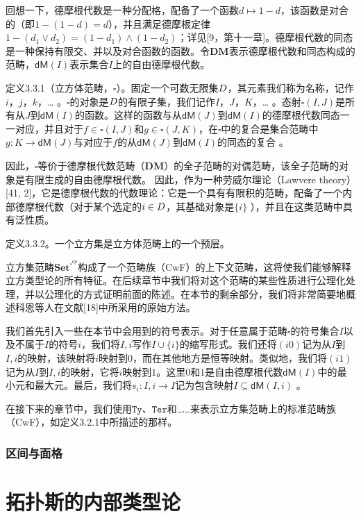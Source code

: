 \documentclass{ctexrep}
\let\mathbb\relax %
\theoremstyle{plain}
\theoremstyle{definition}
\theoremstyle{remark}
\newcommand\Ty{\mathtt{Ty}}
\newcommand\Ter{\mathtt{Ter}}
\newcommand\Set{\mathbf{Set}}
\newcommand{\DM}{\mathbf{DM}}
\newcommand{\dM}{\mathsf{dM}}
\newcommand{\ul}{{\rule[0ex]{0.5em}{0.4pt}}} %
\begin{document}
回想一下，德摩根代数是一种分配格，配备了一个函数\(d \mapsto 1 - d\)，该函数是对合的（即\(1 - (1 - d) = d\)），并且满足德摩根定律\(1 - (d_1 \lor d_2) = (1 - d_1) \land (1 - d_2)\)；详见[9，第十一章]。德摩根代数的同态是一种保持有限交、并以及对合函数的函数。令\(\DM\)表示德摩根代数和同态构成的范畴，\(\dM(I)\)表示集合\(I\)上的自由德摩根代数。

定义3.3.1（立方体范畴，\(\square\)）。固定一个可数无限集\(\mathbb{D}\)，其元素我们称为名称，记作\(i\)，\(j\)，\(k\)，… 。\(\square\)的对象是\(\mathbb{D}\)的有限子集，我们记作\(I\)，\(J\)，\(K\)，… 。态射\(\square(I, J)\)是所有从\(J\)到\(\dM(I)\)的函数。这样的函数与从\(\dM(J)\)到\(\dM(I)\)的德摩根代数同态一一对应，并且对于\(f\in\square(I, J)\)和\(g\in\square(J, K)\)，在\(\square\)中的复合是集合范畴中\(g: K \to \dM(J)\)与对应于\(f\)的从\(\dM(J)\)到\(\dM(I)\)的同态的复合 。

因此，\(\square\)等价于德摩根代数范畴（\(\DM\)）的全子范畴的对偶范畴，该全子范畴的对象是有限生成的自由德摩根代数。 因此，作为一种劳威尔理论（Lawvere theory）[41, 2]，它是德摩根代数的代数理论：它是一个具有有限积的范畴，配备了一个内部德摩根代数（对于某个选定的\(i \in \mathbb{D}\)，其基础对象是\(\{i\}\) ），并且在这类范畴中具有泛性质。 

定义3.3.2。一个立方集是立方体范畴上的一个预层。 

立方集范畴\(\Set^{\square^{op}}\)构成了一个范畴族（CwF）的上下文范畴，这将使我们能够解释立方类型论的所有特征。在后续章节中我们将对这个范畴的某些性质进行公理化处理，并以公理化的方式证明前面的陈述。在本节的剩余部分，我们将非常简要地概述科恩等人在文献[18]中所采用的原始方法。

我们首先引入一些在本节中会用到的符号表示。对于任意属于范畴\(\square\)的符号集合\(I\)以及不属于\(I\)的符号\(i\)，我们将\(I,i\)写作\(I \cup \{i\}\)的缩写形式。我们还将\((i0)\)记为从\(I\)到\(I,i\)的映射，该映射将\(i\)映射到\(0\)，而在其他地方是恒等映射。类似地，我们将\((i1)\)记为从\(I\)到\(I,i\)的映射，它将\(i\)映射到\(1\)。这里\(0\)和\(1\)是自由德摩根代数\(\dM(I)\)中的最小元和最大元。最后，我们将\(s_{i}: I,i \to I\)记为包含映射\(I \subseteq \dM(I, i)\) 。 

在接下来的章节中，我们使用\(\Ty\)、\(\Ter\)和\(\ul .\ul \)来表示立方集范畴上的标准范畴族（CwF），如定义3.2.1中所描述的那样。

\subsection{区间与面格}

\chapter{拓扑斯的内部类型论}
\end{document}
